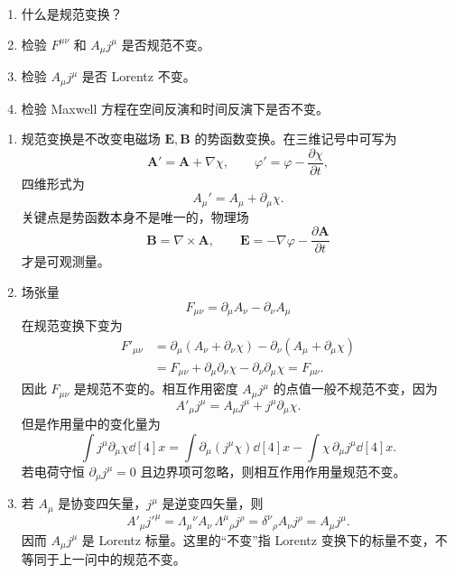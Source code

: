 

\begin{question}
\begin{enumerate}
  \item 什么是规范变换？
  \item 检验 $F^{\mu\nu}$ 和 $A_\mu j^\mu$ 是否规范不变。
  \item 检验 $A_\mu j^\mu$ 是否 Lorentz 不变。
  \item 检验 Maxwell 方程在空间反演和时间反演下是否不变。
\end{enumerate}
\begin{solution}
\begin{enumerate}
  \item 规范变换是不改变电磁场 $\mathbf E,\mathbf B$ 的势函数变换。在三维记号中可写为
  \[
    \mathbf A' = \mathbf A + \nabla \chi,\qquad
    \varphi' = \varphi - \frac{\partial \chi}{\partial t},
  \]
  四维形式为
  \[
    A_\mu' = A_\mu + \partial_\mu \chi .
  \]
  关键点是势函数本身不是唯一的，物理场
  \[
    \mathbf B = \nabla \times \mathbf A,
    \qquad
    \mathbf E = -\nabla \varphi - \frac{\partial \mathbf A}{\partial t}
  \]
  才是可观测量。

  \item 场张量
  \[
    F_{\mu\nu}=\partial_\mu A_\nu-\partial_\nu A_\mu
  \]
  在规范变换下变为
  \[
  \begin{aligned}
    F'_{\mu\nu}
    &= \partial_\mu(A_\nu+\partial_\nu\chi)-\partial_\nu(A_\mu+\partial_\mu\chi) \\
    &= F_{\mu\nu}+\partial_\mu\partial_\nu\chi-\partial_\nu\partial_\mu\chi
     =F_{\mu\nu} .
  \end{aligned}
  \]
  因此 $F_{\mu\nu}$ 是规范不变的。相互作用密度 $A_\mu j^\mu$ 的点值一般不规范不变，因为
  \[
    A'_\mu j^\mu=A_\mu j^\mu+j^\mu\partial_\mu\chi .
  \]
  但是作用量中的变化量为
  \[
    \int j^\mu\partial_\mu\chi\dd[4]{x}
    =\int \partial_\mu(j^\mu\chi)\dd[4]{x}
     -\int \chi\,\partial_\mu j^\mu\dd[4]{x} .
  \]
  若电荷守恒 $\partial_\mu j^\mu=0$ 且边界项可忽略，则相互作用作用量规范不变。

  \item 若 $A_\mu$ 是协变四矢量，$j^\mu$ 是逆变四矢量，则
  \[
    A'_\mu j'^{\mu}
    =\Lambda_\mu{}^\nu A_\nu\,\Lambda^\mu{}_{\rho}j^\rho
    =\delta^\nu{}_{\rho}A_\nu j^\rho
    =A_\mu j^\mu .
  \]
  因而 $A_\mu j^\mu$ 是 Lorentz 标量。这里的“不变”指 Lorentz 变换下的标量不变，不等同于上一问中的规范不变。


\end{enumerate}
\end{solution}
\end{question}
